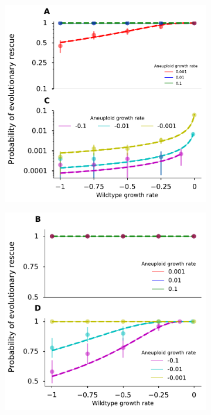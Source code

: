 \documentclass[12pt]{extarticle}
\begin{document}
\begin{figure}
\begin{subfigure}{0.5\textwidth}
\includegraphics[width=1\textwidth]{Figures/CombinedSubplot.pdf}
\end{subfigure}
\begin{subfigure}{0.5\textwidth}
\includegraphics[width=1\textwidth]{Figures/CombinedSubplotLargePop.pdf}

\end{subfigure}
\end{figure}
\end{document}
